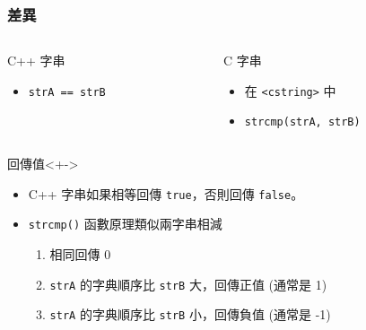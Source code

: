\documentclass[utf8]{beamer}
\begin{document}
\begin{CJK}{UTF8}{bkai}
\begin{frame}[fragile]
  \frametitle{差異}
  \begin{columns}[T]
    \begin{column}[T]{5.5cm}
    \begin{block}{C++ 字串}
      \begin{itemize}
      \item \lstinline{strA == strB}{}
      \end{itemize}
    \end{block}
    \end{column}
    \begin{column}[T]{5.5cm}
    \begin{block}{C 字串}
      \begin{itemize}
      \item 在 \lstinline{<cstring>}{} 中
      \item \lstinline{strcmp(strA, strB)}{}
      \end{itemize}
    \end{block}
    \end{column}
  \end{columns}
  \onslide<+->
  \begin{exampleblock}{回傳值}<+->
    \begin{itemize}[<+->]
    \item C++ 字串如果\alert{相等}回傳 \lstinline{true}{}，否則回傳 \lstinline{false}{}。
    \item \lstinline{strcmp()}{} 函數原理類似\alert{兩字串相減}
      \begin{enumerate}
      \item \alert{相同回傳 0}
      \item \lstinline{strA}{} 的\alert{字典順序}比 \lstinline{strB}{} 大，回傳正值 (通常是 1)
      \item \lstinline{strA}{} 的\alert{字典順序}比 \lstinline{strB}{} 小，回傳負值 (通常是 -1)
      \end{enumerate}
    \end{itemize}
  \end{exampleblock}
\end{frame}


\end{CJK}
\end{document}
